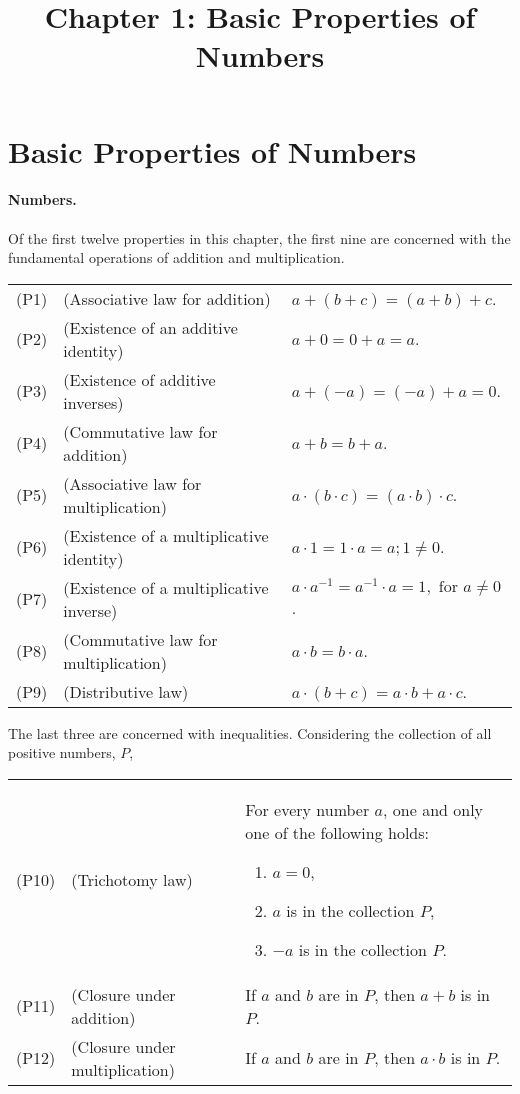 \documentclass{article}
\begin{document}
\title{Chapter 1: Basic Properties of Numbers}

\section{Basic Properties of Numbers}

\paragraph{Numbers.} Of the first twelve properties in this chapter, the first nine are concerned with the fundamental operations of addition and multiplication.

\begin{tabular}{l l p{4in}}
  (P1) & (Associative law for addition) & $a + (b + c) = (a + b) + c$. \label{p1} \\
  (P2) & (Existence of an additive identity) & $a + 0 = 0 + a = a$. \label{p2} \\
  (P3) & (Existence of additive inverses) & $a + (-a) = (-a) + a = 0$. \label{p3} \\
  (P4) & (Commutative law for addition) & $a + b = b + a$. \label{p4} \\
  (P5) & (Associative law for multiplication) & $a \cdot (b \cdot c) = (a \cdot b) \cdot c$. \label{p5} \\
  (P6) & (Existence of a multiplicative identity) & $a \cdot 1 = 1 \cdot a = a; 1 \neq 0$. \label{p6} \\
  (P7) & (Existence of a multiplicative inverse) & $a \cdot a^{-1} = a^{-1} \cdot a = 1, \text{ for } a \neq 0$. \label{p7} \\
  (P8) & (Commutative law for multiplication) & $a \cdot b = b \cdot a$. \label{p8} \\
  (P9) & (Distributive law) & $a \cdot (b + c) = a \cdot b + a \cdot c$. \label{p9}
\end{tabular}

The last three are concerned with inequalities. Considering the collection of all positive numbers, $P$,

\begin{tabular}{l l p{4in}}
  (P10) & (Trichotomy law) & For every number $a$, one and only one of the following holds: \begin{enumerate}
      \itemsep0em
      \item $a = 0$,
      \item $a$ is in the collection $P$,
      \item $-a$ is in the collection $P$. \label{p10}
    \end{enumerate} \\
  (P11) & (Closure under addition) & If $a$ and $b$ are in $P$, then $a + b$ is in $P$. \\
  (P12) & (Closure under multiplication) & If $a$ and $b$ are in $P$, then $a \cdot b$ is in $P$.
\end{tabular}
\end{document}
